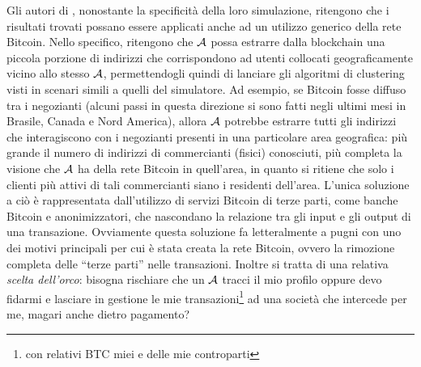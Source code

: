 Gli autori di \cite{user-privacy}, nonostante la specificità della loro simulazione, ritengono che i risultati trovati possano essere applicati anche ad un utilizzo generico della rete Bitcoin.
Nello specifico, ritengono che $\mathcal{A}$ possa estrarre dalla blockchain una piccola porzione di indirizzi che corrispondono ad utenti collocati geograficamente vicino allo stesso $\mathcal{A}$, permettendogli quindi di lanciare gli algoritmi di clustering visti in scenari simili a quelli del simulatore.
Ad esempio, se Bitcoin fosse diffuso tra i negozianti (alcuni passi in questa direzione si sono fatti negli ultimi mesi in Brasile, Canada e Nord America), allora $\mathcal{A}$ potrebbe estrarre tutti gli indirizzi che interagiscono con i negozianti presenti in una particolare area geografica: più grande il numero di indirizzi di commercianti (fisici) conosciuti, più completa la visione che $\mathcal{A}$ ha della rete Bitcoin in quell'area, in quanto si ritiene che solo i clienti più attivi di tali commercianti siano i residenti dell'area.
L'unica soluzione a ciò è rappresentata dall'utilizzo di servizi Bitcoin di terze parti, come banche Bitcoin e anonimizzatori, che nascondano la relazione tra gli input e gli output di una transazione. Ovviamente questa soluzione fa letteralmente a pugni con uno dei motivi principali per cui è stata creata la rete Bitcoin, ovvero la rimozione completa delle ``terze parti'' nelle transazioni. Inoltre si tratta di una relativa \emph{scelta dell'orco}: bisogna rischiare che un $\mathcal{A}$ tracci il mio profilo oppure devo fidarmi e lasciare in gestione le mie transazioni\footnote{con relativi BTC miei e delle mie controparti} ad una società che intercede per me, magari anche dietro pagamento?

